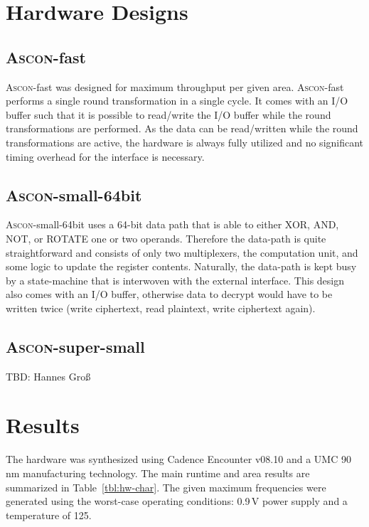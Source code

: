 \documentclass[runningheads]{llncs}
\begin{document}
\section{Hardware Designs}

\subsection{\textsc{Ascon}-fast}

\textsc{Ascon}-fast was designed for maximum throughput per given area.
\textsc{Ascon}-fast performs a single round transformation in a single cycle. It comes with an I/O buffer such that it is possible to read/write the I/O buffer while the round transformations are performed. As the data can be read/written while the round transformations are active, the hardware is always fully utilized and no significant timing overhead for the interface is necessary. 

\subsection{\textsc{Ascon}-small-64bit}

\textsc{Ascon}-small-64bit uses a 64-bit data path that is able to either XOR, AND, NOT, or ROTATE one or two operands. Therefore the data-path is quite straightforward and consists of only two multiplexers, the computation unit, and some logic to update the register contents. Naturally, the data-path is kept busy by a state-machine that is interwoven with the external interface. This design also comes with an I/O buffer, otherwise data to decrypt would have to be written twice (write ciphertext, read plaintext, write ciphertext again). 

\subsection{\textsc{Ascon}-super-small}

TBD: Hannes Gro{\ss}

\section{Results} \label{sec:results}

The hardware was synthesized using Cadence Encounter v08.10 and a UMC 90\,nm manufacturing technology. The main runtime and area results are summarized in Table~\ref{tbl:hw-char}.
The given maximum frequencies were generated using  the worst-case operating
conditions: 0.9\,V power supply and a temperature of 125\celsius.
\end{document}
